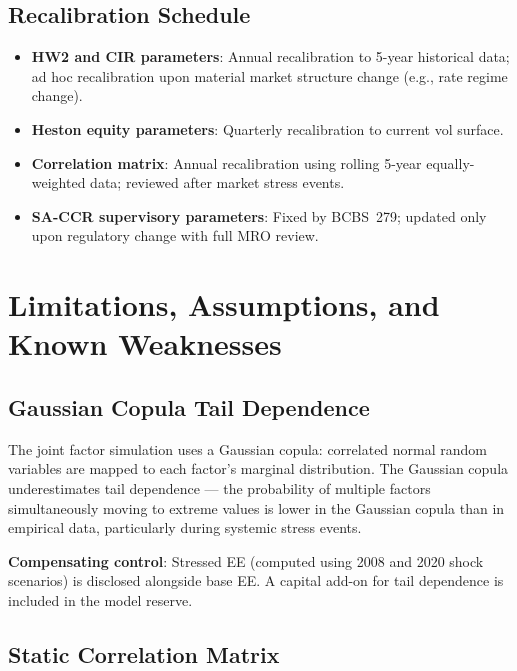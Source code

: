 \documentclass[11pt,a4paper]{article}
\begin{document}
\subsection{Recalibration Schedule}

\begin{itemize}[noitemsep]
  \item \textbf{HW2 and CIR parameters}: Annual recalibration to 5-year
        historical data; ad hoc recalibration upon material market structure
        change (e.g., rate regime change).
  \item \textbf{Heston equity parameters}: Quarterly recalibration to current
        vol surface.
  \item \textbf{Correlation matrix}: Annual recalibration using rolling 5-year
        equally-weighted data; reviewed after market stress events.
  \item \textbf{SA-CCR supervisory parameters}: Fixed by BCBS~279; updated
        only upon regulatory change with full MRO review.
\end{itemize}

\section{Limitations, Assumptions, and Known Weaknesses}

\subsection{Gaussian Copula Tail Dependence}

The joint factor simulation uses a Gaussian copula: correlated normal random
variables are mapped to each factor's marginal distribution. The Gaussian
copula underestimates tail dependence --- the probability of multiple factors
simultaneously moving to extreme values is lower in the Gaussian copula than
in empirical data, particularly during systemic stress events.

\textbf{Compensating control}: Stressed EE (computed using 2008 and 2020 shock
scenarios) is disclosed alongside base EE. A capital add-on for tail dependence
is included in the model reserve.

\subsection{Static Correlation Matrix}
\end{document}
